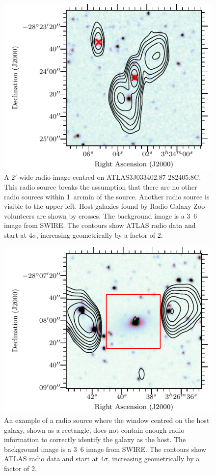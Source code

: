 \documentclass[11pt, a4paper]{book}
\begin{document}
    \begin{figure}
      \centering
      \includegraphics[width=0.6\linewidth]{atlas-images/CI0077C1_fig.pdf}
      \caption[A radio source breaking our assumption that there are no other radio sources with 1~arcmin of the source.]{A $2'$-wide radio image centred on ATLAS3\textunderscore{}J033402.87-282405.8C.
        This radio source breaks the assumption that there are no other radio
        sources within 1~arcmin of the source. Another radio source is visible
        to the upper-left. Host galaxies found by Radio Galaxy Zoo volunteers
        are shown by crosses. {The background image
        is a \unit{3.6}{\micro\meter} image from SWIRE. The contours show ATLAS radio data and start at $4\sigma$, increasing geometrically by a factor of 2.}}
      \label{fig:broken-isolation}
    \end{figure}

    \begin{figure}
      \centering
      \includegraphics[width=0.6\linewidth]{atlas-images/CI2363_fig.pdf}
      \caption[A radio source where the window centred on the host galaxy does not contain enough radio information to correctly identify the galaxy as a host.]{An example of a radio source where the window centred on the
        host galaxy, shown as a rectangle, does not contain enough radio
        information to correctly identify the galaxy as the host. {The background image
        is a \unit{3.6}{\micro\meter} image from SWIRE. The contours show ATLAS radio data and start at $4\sigma$, increasing geometrically by a factor of 2.}}
      \label{fig:broken-window-size}
    \end{figure}
\end{document}

